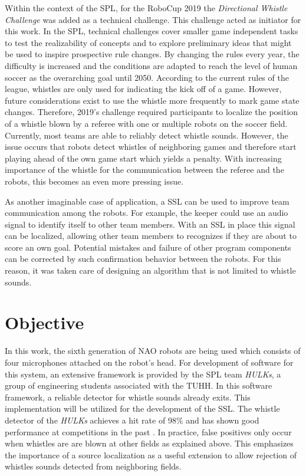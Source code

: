 Within the context of the \ac{SPL}, for the \ac{RoboCup} 2019 the \textit{Directional
Whistle Challenge} was added as a technical challenge. This challenge acted as
initiator for this work. In the \ac{SPL}, technical challenges cover smaller
game independent tasks to test the realizability of concepts and to explore
preliminary ideas that might be used to inspire prospective rule changes. By
changing the rules every year, the difficulty is increased and the conditions
are adapted to reach the level of human soccer as the overarching goal until
2050. According to the current rules of the league,
whistles are only used for indicating the kick off of a game. However,
future considerations exist to use the whistle more frequently to mark
game state changes. Therefore, 2019's challenge required participants to
localize the position of a whistle blown by a referee with one or
multiple robots on the soccer field.
Currently, most teams are able to reliably detect whistle sounds. However, the
issue occurs that robots detect whistles of neighboring games and therefore
start playing ahead of the own game start which yields a penalty. With
increasing importance of the whistle for the communication between the referee
and the robots, this becomes an even more pressing issue.

As another imaginable case of application, a \ac{SSL} can be used to improve team
communication among the robots.
For example, the keeper could use an audio signal to identify itself to other team
members. With an \ac{SSL} in place this signal can be localized, allowing other
team members to recognizes if they are about to score an own goal.
Potential mistakes and failure of other program components can be corrected by such
confirmation behavior between the robots.
For this reason, it was taken care of designing an algorithm that is not
limited to whistle sounds.

\section{Objective}
\label{sec:01_objective}

In this work, the sixth generation of NAO robots are being used
which consists of four microphones attached on the robot's head.
For development of software for this system, an extensive framework is provided by
the \ac{SPL} team \textit{HULKs}, a group of engineering students associated
with the \ac{TUHH}.
In this software framework, a reliable detector for whistle sounds already exits.
This implementation will be utilized for the development of the \ac{SSL}. The
whistle detector of the \textit{HULKs} achieves a hit rate of 98\si{\percent}
and has shown good performance at competitions in the past \cite{Hasselbring}.
 In practice, false positives only occur when whistles are are blown
at other fields as explained above. This emphasizes the importance of
a source localization as a useful extension to allow rejection of whistles
sounds detected from neighboring fields.

